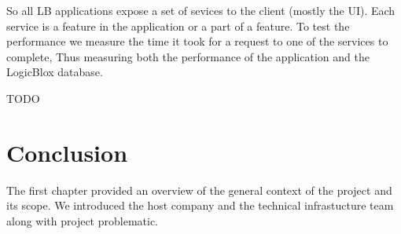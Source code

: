 So all LB applications expose a set of sevices to the client (mostly the UI).
Each service is a feature in the application or a part of a feature. To test the
performance we measure the time it took for a request to one of the services to
complete, Thus measuring both the performance of the  application and the
LogicBlox database.

TODO

\section*{Conclusion}
The first chapter provided an overview of the general context of the project and
its scope. We introduced the host company and the technical infrastucture team
along with project problematic.
